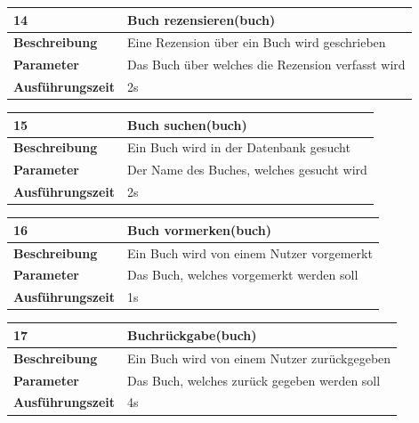 \documentclass[fontsize=12pt,paper=a4,twoside]{scrartcl}
\begin{document}
  \begin{table}[htbp]
  \label{a14}
  \begin{tabular}{|l|p{10cm}|}
  \hline 
  \textbf{14} & \textbf{Buch rezensieren(buch)} \\ \hline
  \textbf{Beschreibung} & Eine Rezension über ein Buch wird geschrieben\\ \hline
  \textbf{Parameter} & Das Buch über welches die Rezension verfasst wird \\ \hline
  \textbf{Ausführungszeit} & 2s\\ \hline
  \end{tabular}
  \end{table}

  \begin{table}[htbp]
  \label{a15}
  \begin{tabular}{|l|p{10cm}|}
  \hline 
  \textbf{15} & \textbf{Buch suchen(buch)} \\ \hline
  \textbf{Beschreibung} & Ein Buch wird in der Datenbank gesucht\\ \hline
  \textbf{Parameter} & Der Name des Buches, welches gesucht wird \\ \hline
  \textbf{Ausführungszeit} & 2s\\ \hline
  \end{tabular}
  \end{table}


  \begin{table}[htbp]
  \label{a16}
  \begin{tabular}{|l|p{10cm}|}
  \hline 
  \textbf{16} & \textbf{Buch vormerken(buch)} \\ \hline
  \textbf{Beschreibung} & Ein Buch wird von einem Nutzer vorgemerkt\\ \hline
  \textbf{Parameter} & Das Buch, welches vorgemerkt werden soll \\ \hline
  \textbf{Ausführungszeit} & 1s\\ \hline
  \end{tabular}
  \end{table}


  \begin{table}[htbp]
  \label{a17}
  \begin{tabular}{|l|p{10cm}|}
  \hline 
  \textbf{17} & \textbf{Buchrückgabe(buch)} \\ \hline
  \textbf{Beschreibung} & Ein Buch wird von einem Nutzer zurückgegeben\\ \hline
  \textbf{Parameter} & Das Buch, welches zurück gegeben werden soll \\ \hline
  \textbf{Ausführungszeit} & 4s\\ \hline
  \end{tabular}
  \end{table}
\end{document}
